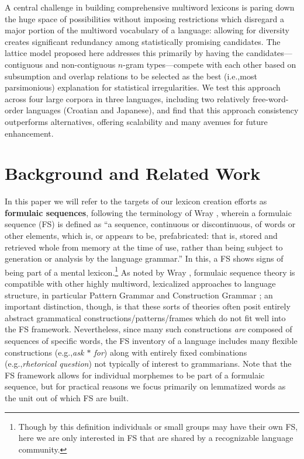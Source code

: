 \documentclass[11pt,letterpaper]{article}
\makeatletter
\def \eg {e.g.,\@ }
\def \ie {i.e.,\@ }
\newcommand{\gap}{$*$\xspace}
\newcommand{\ex}[1]{\textit{#1}\xspace}
\newcommand{\termdef}[1]{\textbf{#1}\xspace}
\makeatother
\begin{document}
A central challenge in building comprehensive multiword lexicons is paring down the huge space of possibilities without imposing restrictions which disregard a major portion of the multiword vocabulary of a language: allowing for diversity creates significant redundancy among statistically promising candidates. The lattice model proposed here addresses this primarily by having the candidates---contiguous and non-contiguous $n$-gram types---compete with each other based on subsumption and overlap relations to be selected as the best (\ie most parsimonious) explanation for statistical irregularities. We test this approach across four large corpora in three languages, including two relatively free-word-order languages (Croatian and Japanese), and find that this approach consistency outperforms alternatives, offering scalability and many avenues for future enhancement.




\section{Background and Related Work}

\label{sec:background}

In this paper we will refer to the targets of our lexicon creation efforts as \termdef{formulaic sequences}, following the terminology of Wray , wherein a formulaic sequence (FS) is defined as ``a sequence, continuous or discontinuous, of words or other elements, which is, or appears to be, prefabricated: that is, stored and retrieved whole from memory at the time of use, rather than being subject to generation or analysis by the language grammar.'' In this, a FS shows signs of being part of a mental lexicon.\footnote{Though by this definition individuals or small groups may have their own FS, here we are only interested in FS that are shared by a recognizable language community.} As noted by Wray ,  formulaic sequence theory is compatible with other highly multiword, lexicalized approaches to language structure, in particular Pattern Grammar \cite{PG} and Construction Grammar \cite{ConG}; an important distinction, though, is that these sorts of theories often posit entirely abstract grammatical constructions/patterns/frames which do not fit well into the FS framework. Nevertheless, since many such constructions \textit{are} composed of sequences of specific words, the FS inventory of a language includes many flexible constructions (\eg \ex{ask \gap for}) along with entirely fixed combinations (\eg \ex{rhetorical question}) not typically of interest to grammarians. Note that the FS framework allows for individual morphemes to be part of a formulaic sequence, but for practical reasons we focus primarily on lemmatized words as the unit out of which FS are built.
\end{document}
